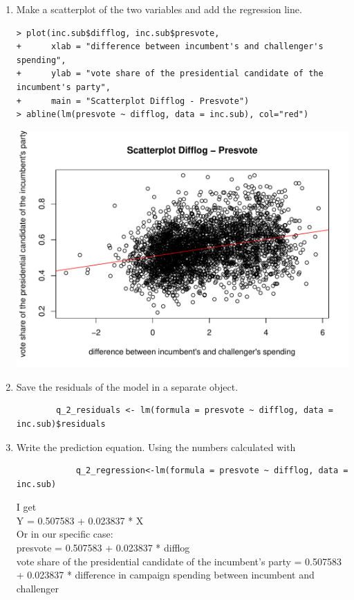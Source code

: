 \documentclass[12pt,letterpaper]{article}
\begin{document}
\begin{enumerate}
		\item Make a scatterplot of the two variables and add the regression line.  \\
		\begin{verbatim}
> plot(inc.sub$difflog, inc.sub$presvote, 
+      xlab = "difference between incumbent's and challenger's spending",
+      ylab = "vote share of the presidential candidate of the incumbent's party",
+      main = "Scatterplot Difflog - Presvote")
> abline(lm(presvote ~ difflog, data = inc.sub), col="red")
	\end{verbatim}
	 \includegraphics[width=\textwidth,height=\textheight,keepaspectratio]{Q_2_Plot}
		\item Save the residuals of the model in a separate object.	\\
		\begin{verbatim}
		q_2_residuals <- lm(formula = presvote ~ difflog, data = inc.sub)$residuals
	\end{verbatim}
		\item Write the prediction equation.
		Using the numbers calculated with
		\begin{verbatim}
			q_2_regression<-lm(formula = presvote ~ difflog, data = inc.sub)
		\end{verbatim}
		I get \\
		Y = 0.507583 + 0.023837 * X \\
		Or in our specific case: \\
		presvote = 0.507583 + 0.023837 * difflog \\
		vote share of the presidential candidate of the incumbent's party = 0.507583 + 0.023837 * difference in campaign spending between incumbent and challenger
	\end{enumerate}
	
\end{document}
